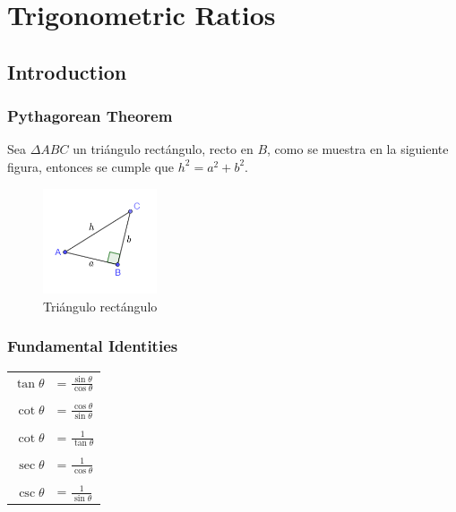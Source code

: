 \chapter{Trigonometric Ratios}

\section{Introduction}

\subsection{Pythagorean Theorem}

Sea $\Delta ABC$ un triángulo rectángulo, recto en $B$, como se muestra
en la siguiente figura, entonces se cumple que $h^2=a^2+b^2$.

\begin{figure}[ht]
    \centering
    \includegraphics[width=0.3\textwidth]{./images/pythagorean_theorem.png}
    \caption{Triángulo rectángulo}
    \label{fig:pythagorean_theorem}
\end{figure}

\subsection{Fundamental Identities}

\begin{tabular}{rl}
    $\tan\theta$ &= $\frac{\sin\theta}{\cos\theta}$ \\ 
    \\
    $\cot\theta$ &= $\frac{\cos\theta}{\sin\theta}$ \\
    \\
    $\cot\theta$ &= $\frac{1}{\tan\theta}$ \\
    \\
    $\sec\theta$ &= $\frac{1}{\cos\theta}$ \\
    \\
    $\csc\theta$ &= $\frac{1}{\sin\theta}$ \\
\end{tabular}

